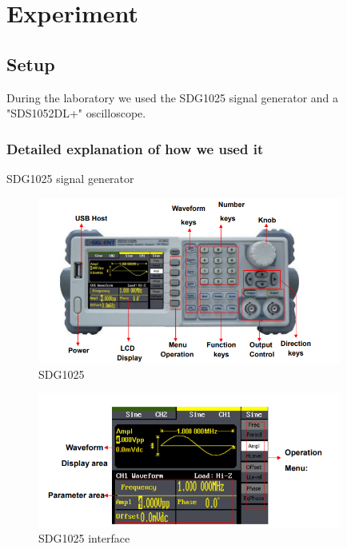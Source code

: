 \section{Experiment}
\subsection{Setup}

During the laboratory we used the SDG1025 signal generator and a "SDS1052DL+" oscilloscope.
\subsubsection*{Detailed explanation of how we used it}
SDG1025 signal generator
\begin{figure}[H]
	\centering
	\includegraphics[width=10cm]{images/11.png}
	\caption{SDG1025}
	\label{fig:wow1}
\end{figure}

\begin{figure}[H]
	\centering
	\includegraphics[width=10cm]{images/15.png}
	\caption{SDG1025 interface}
	\label{fig:wow5}
\end{figure}

